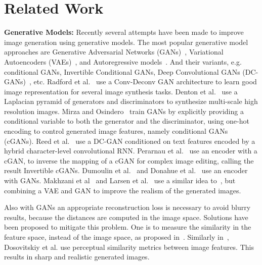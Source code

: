 \documentclass[runningheads]{llncs}
\begin{document}
\section{Related Work} \label{sec:related}

\textbf{Generative Models:} Recently several attempts have been made to improve image generation using generative models. The most popular generative model approaches are Generative Adversarial Networks (GANs)~\cite{goodfellow},  Variational Autoencoders (VAEs)~\cite{kingma2013auto}, and Autoregressive models~\cite{oord2016pixel}. And their variants, e.g. conditional GANs, Invertible Conditional GANs, Deep Convolutional GANs (DC-GANs)~\cite{radford},  etc. Radford et al.~\cite{radford} use a Conv-Deconv GAN architecture  to learn good  image representation for several image synthesis tasks.  Denton et al.~\cite{denton} use a Laplacian pyramid of generators and discriminators to synthesize multi-scale high resolution images. Mirza and Osindero~\cite{cgan} train GANs by explicitly providing a conditional variable to both the generator and the discriminator, using one-hot encoding to control generated image features, namely conditional GANs (cGANs). Reed et al.~\cite{reed} use a DC-GAN conditioned on text features encoded by a hybrid character-level convolutional RNN. Perarnau et al.~\cite{perarnau} use an encoder with a cGAN, to inverse the mapping of a cGAN for complex image editing, calling the result Invertible cGANs. Dumoulin et al.~\cite{dumoulin} and Donahue et al.~\cite{donahue} use an encoder with GANs. Makhzani et al~\cite{makhzani} and Larsen et al.~\cite{larsen} use a similar idea to~\cite{perarnau}, but combining a VAE and GAN to improve the realism of the generated images.

Also with GANs an appropriate reconstruction loss is necessary to avoid blurry results, because the distances are computed in the image space. Solutions have been proposed to mitigate this problem. One is to measure the similarity in the feature space, instead of the image space, as proposed in~\cite{larsen}. Similarly in~\cite{dosovitskiy2}, Dosovitskiy et al. use perceptual similarity metrics between image features. This results in  sharp and realistic generated images.
\end{document}
